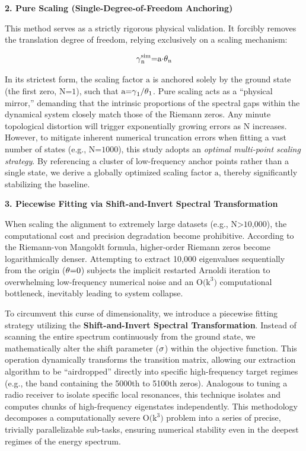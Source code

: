 \documentclass[fractalfract,article,submit,oneauthor,pdftex]{Definitions/mdpi}
\begin{document}
\textbf{2. Pure Scaling (Single-Degree-of-Freedom Anchoring)}

This method serves as a strictly rigorous physical validation. It
forcibly removes the translation degree of freedom, relying exclusively
on a scaling mechanism:

\begin{equation}
\text{\ensuremath{\gamma}}_{\text{n}}^{\text{sim}}\text{=}\text{a}\text{\ensuremath{\cdot}}\text{\ensuremath{\theta}}_{\text{n}}
\end{equation}

In its strictest form, the scaling factor \(\text{a}\) is anchored
solely by the ground state (the first zero, \(\text{N}\text{=1}\)), such
that \(\text{a}\text{=}\text{\ensuremath{\gamma}}_{\text{1}}\text{/}\text{\ensuremath{\theta}}_{\text{1}}\).
Pure scaling acts as a ``physical mirror,'' demanding that the intrinsic
proportions of the spectral gaps within the dynamical system closely
match those of the Riemann zeros. Any minute topological distortion will
trigger exponentially growing errors as \(\text{N}\) increases. However,
to mitigate inherent numerical truncation errors when fitting a vast
number of states (e.g., \(\text{N}\text{=1000}\)), this study adopts an
\emph{optimal multi-point scaling strategy}. By referencing a cluster of
low-frequency anchor points rather than a single state, we derive a
globally optimized scaling factor \(\text{a}\), thereby significantly
stabilizing the baseline.

\textbf{3. Piecewise Fitting via Shift-and-Invert Spectral
Transformation}

When scaling the alignment to extremely large datasets (e.g.,
\(\text{N}\text{>10,000}\)), the computational cost and precision
degradation become prohibitive. According to the Riemann-von Mangoldt
formula, higher-order Riemann zeros become logarithmically denser.
Attempting to extract 10,000 eigenvalues sequentially from the origin
(\(\text{\ensuremath{\theta}}\text{=0}\)) subjects the implicit restarted Arnoldi
iteration to overwhelming low-frequency numerical noise and an
\(\text{O}\text{(}\text{k}^{\text{3}}\text{)}\) computational
bottleneck, inevitably leading to system collapse.

To circumvent this curse of dimensionality, we introduce a piecewise
fitting strategy utilizing the \textbf{Shift-and-Invert Spectral
Transformation}. Instead of scanning the entire spectrum continuously
from the ground state, we mathematically alter the shift parameter
(\(\text{\ensuremath{\sigma}}\)) within the objective function. This operation dynamically
transforms the transition matrix, allowing our extraction algorithm to
be ``airdropped'' directly into specific high-frequency target regimes
(e.g., the band containing the 5000th to 5100th zeros). Analogous to
tuning a radio receiver to isolate specific local resonances, this
technique isolates and computes chunks of high-frequency eigenstates
independently. This methodology decomposes a computationally
severe \(\text{O}\text{(}\text{k}^{\text{3}}\text{)}\) problem
into a series of precise, trivially parallelizable sub-tasks,
ensuring numerical stability even in the deepest regimes of the energy
spectrum.
\end{document}
